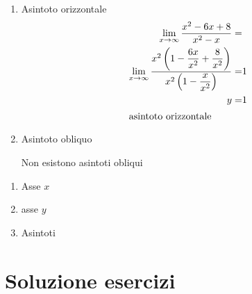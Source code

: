 \begin{exercise}
\begin{itemize}
\begin{enumerate}
		\item Asintoto orizzontale 
		\begin{align*}
	\lim_{x\to \infty}\dfrac{x^2-6x+8}{x^2-x}=&\\
	\lim_{x\to \infty}\dfrac{x^2\left(1-\dfrac{6x}{x^2}+\dfrac{8}{x^2}\right)}{x^2\left(1-\dfrac{x}{x^2}\right)}=&1\\
	y=&1\\
	\intertext{asintoto orizzontale}
		\end{align*}
		\item Asintoto obliquo
		
		Non esistono asintoti obliqui
	\end{enumerate}
	\begin{enumerate}
		\item Asse $x$
		\item asse $y$
		
		\item Asintoti
		
	\end{enumerate}
\end{itemize}
\end{exercise}





\tcbstoprecording
\newpage
\section{Soluzione esercizi}
\tcbinputrecords
